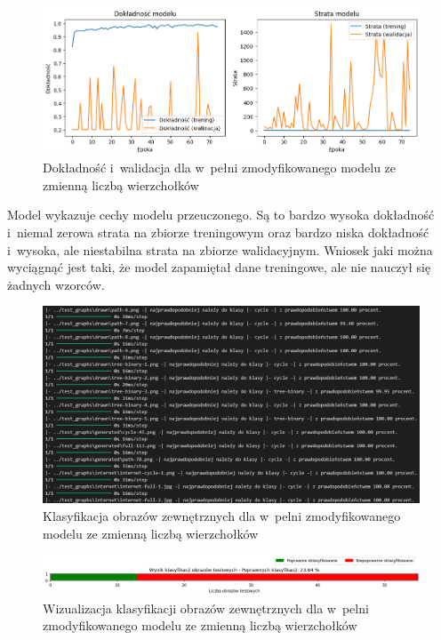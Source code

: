 \begin{figure}[ht]
	\centering
	\includegraphics[width=15.5cm]{resources/tests/images/v4/multiple_edges_img.png}
	\caption{Dokładność i~walidacja dla w~pełni zmodyfikowanego modelu ze zmienną liczbą wierzchołków}
	\label{Fig:tests-var-2a}
\end{figure}
\FloatBarrier

Model wykazuje cechy modelu przeuczonego.
Są to bardzo wysoka dokładność i~niemal zerowa strata na zbiorze treningowym
oraz bardzo niska dokładność i~wysoka, ale niestabilna strata na zbiorze walidacyjnym.
Wniosek jaki można wyciągnąć jest taki, że model zapamiętał dane treningowe, ale nie nauczył się żadnych wzorców.

\begin{figure}[ht]
	\centering
	\includegraphics[width=15.5cm]{resources/tests/images/v4/multiple_edges_txt.png}
	\caption{Klasyfikacja obrazów zewnętrznych dla w~pelni zmodyfikowanego modelu ze zmienną liczbą wierzchołków}
	\label{Fig:tests-var-2b}
\end{figure}
\FloatBarrier

\begin{figure}[ht]
	\centering
	\includegraphics[width=15.5cm]{resources/tests/images/v4/multiple_edges_bar.png}
	\caption{Wizualizacja klasyfikacji obrazów zewnętrznych dla w~pelni zmodyfikowanego modelu ze zmienną liczbą wierzchołków}
	\label{Fig:tests-var-2c}
\end{figure}
\FloatBarrier

